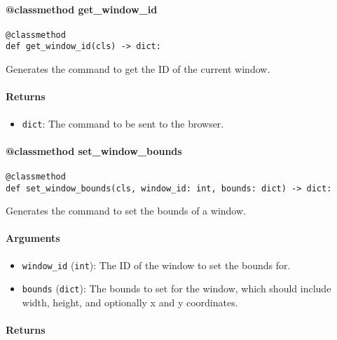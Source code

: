 \documentclass{article}
\begin{document}
\paragraph{@classmethod get\_window\_id}

\begin{lstlisting}[style=pythonstyle]
@classmethod
def get_window_id(cls) -> dict:
\end{lstlisting}

\noindent Generates the command to get the ID of the current window.

\paragraph{Returns}

\begin{itemize}
    \item \lstinline[style=pythonstyle]|dict|: The command to be sent to the browser.
\end{itemize}

\paragraph{@classmethod set\_window\_bounds}

\begin{lstlisting}[style=pythonstyle]
@classmethod
def set_window_bounds(cls, window_id: int, bounds: dict) -> dict:
\end{lstlisting}

\noindent Generates the command to set the bounds of a window.

\paragraph{Arguments}

\begin{itemize}
    \item \lstinline[style=pythonstyle]|window_id| (\lstinline[style=pythonstyle]|int|): The ID of the window to set the bounds for.
    \item \lstinline[style=pythonstyle]|bounds| (\lstinline[style=pythonstyle]|dict|): The bounds to set for the window, which should include width, height, and optionally x and y coordinates.
\end{itemize}

\paragraph{Returns}
\end{document}
